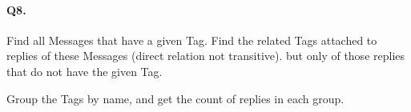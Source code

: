 \paragraph{Q8.}

Find all Messages that have a given Tag. Find the related Tags attached
to replies of these Messages (direct relation not transitive). but only
of those replies that do not have the given Tag.

Group the Tags by name, and get the count of replies in each group.
